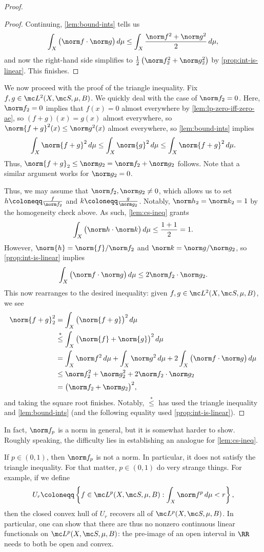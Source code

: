 \documentclass[../notes.tex]{subfiles}
\begin{document}
\begin{proof}
\begin{proof}
		Continuing, \autoref{lem:bound-ints} tells us
		\[\int_X\big(\norm f\cdot\norm g\big)\,d\mu\le\int_X\frac{\norm f^2+\norm g^2}2\,d\mu,\]
		and now the right-hand side simplifies to $\frac12\left(\norm f_2^2+\norm g_2^2\right)$ by \autoref{prop:int-is-linear}. This finishes.
	\end{proof}
	We now proceed with the proof of the triangle inequality. Fix $f,g\in\mc L^2(X,\mc S,\mu,B)$. We quickly deal with the case of $\norm f_2=0$. Here, $\norm f_2=0$ implies that $f(x)=0$ almost everywhere by \autoref{lem:lp-zero-iff-zero-ae}, so $(f+g)(x)=g(x)$ almost everywhere, so $\norm{f+g}^2(x)\le\norm g^2(x)$ almost everywhere, so \autoref{lem:bound-ints} implies
	\[\int_X\norm{f+g}^2\,d\mu\le\int_X\norm{g}^2\,d\mu\le\int_X\norm{f+g}^2\,d\mu.\]
	Thus, $\norm{f+g}_2\le\norm g_2=\norm f_2+\norm g_2$ follows. Note that a similar argument works for $\norm g_2=0$.

	Thus, we may assume that $\norm f_2,\norm g_2\ne0$, which allows us to set $h\coloneqq\frac f{\norm f_2}$ and $k\coloneqq\frac g{\norm g_2}$. Notably, $\norm h_2=\norm k_2=1$ by the homogeneity check above. As such, \autoref{lem:cs-ineq} grants
	\[\int_X\big(\norm h\cdot\norm k\big)\,d\mu\le\frac{1+1}2=1.\]
	However, $\norm{h}=\norm{f}/\norm f_2$ and $\norm k=\norm g/\norm g_2$, so \autoref{prop:int-is-linear} implies
	\[\int_X\big(\norm f\cdot\norm g\big)\,d\mu\le2\norm f_2\cdot\norm g_2.\]
	This now rearranges to the desired inequality: given $f,g\in\mc L^2(X,\mc S,\mu,B)$, we see
	\begin{align*}
		\norm{f+g}_2^2 &= \int_X\big(\norm{f+g}\big)^2\,d\mu \\
		&\stackrel*\le \int_X\big(\norm{f}+\norm{g}\big)^2\,d\mu \\
		&= \int_X\norm f^2\,d\mu+\int_X\norm g^2\,d\mu+2\int_X\big(\norm f\cdot\norm g\big)\,d\mu \\
		&\le \norm f_2^2+\norm g_2^2+2\norm f_2\cdot\norm g_2 \\
		&= \big(\norm f_2+\norm g_2\big)^2,
	\end{align*}
	and taking the square root finishes. Notably, $\stackrel*\le$ has used the triangle inequality and \autoref{lem:bound-ints} (and the following equality used \autoref{prop:int-is-linear}).
\end{proof}
\begin{remark}
	In fact, $\norm f_p$ is a norm in general, but it is somewhat harder to show. Roughly speaking, the difficulty lies in establishing an analogue for \autoref{lem:cs-ineq}.
\end{remark}
\begin{remark}
	If $p\in(0,1)$, then $\norm f_p$ is not a norm. In particular, it does not satisfy the triangle inequality. For that matter, $p\in(0,1)$ do very strange things. For example, if we define
	\[U_r\coloneqq\left\{f\in\mc L^p(X,\mc S,\mu,B):\int_X\norm f^p\,d\mu<r\right\},\]
	then the closed convex hull of $U_r$ recovers all of $\mc L^p(X,\mc S,\mu,B)$. In particular, one can show that there are thus no nonzero continuous linear functionals on $\mc L^p(X,\mc S,\mu,B)$: the pre-image of an open interval in $\RR$ needs to both be open and convex.
\end{remark}
\end{document}
